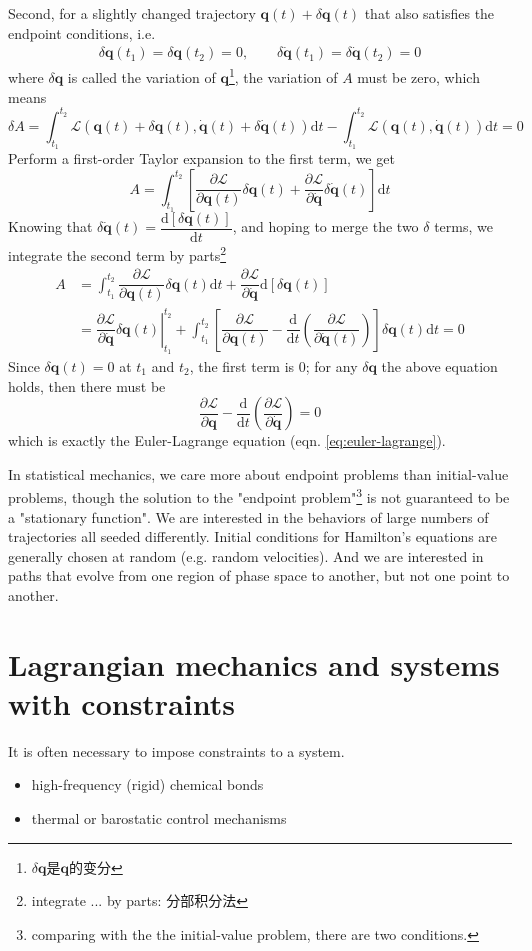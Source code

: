 \documentclass[
  10pt,
  twoside,
  openany,
  b5paper, %
  colorscheme = bootstrap-v4, %
]{qyxf-book}
\numberwithin{equation}{section}
\newcommand{\md}{\mathrm{d}}
\newcommand{\der}[2]{\dfrac{\md #1}{\md #2}}
\newcommand{\p}[2]{\dfrac{\partial #1}{\partial #2}}
\newcommand{\vq}{\boldsymbol{q}}
\newcommand{\dvq}{\dot{\vq}}
\newcommand{\dt}{\mathrm{d}t}
\newcommand{\lag}{\mathcal{L}} %
\newcommand{\intot}{\int_{t_1}^{t_2}}
\begin{document}
Second, for a slightly changed trajectory $\vq(t)+\delta \vq(t)$ that also satisfies the endpoint conditions, i.e.
\begin{gather}
	\delta\vq(t_1)=\delta\vq(t_2)=0,\qquad \delta\dvq(t_1)=\delta\dvq(t_2)=0
\end{gather}
where $\delta\vq$ is called the variation of $\vq$\footnote{$\delta\vq$是$\vq$的变分},
the variation of $A$ must be zero, which means
\begin{equation*}
	\delta A=\intot\lag\left(\vq(t)+\delta\vq(t),\dvq(t)+\delta\dvq(t)\right)\dt
	-\intot\lag\left(\vq(t),\dvq(t)\right)\dt=0
\end{equation*}
Perform a first-order Taylor expansion to the first term, we get
\begin{equation*}
	A=\intot\left[\p{\lag}{\vq(t)}\delta\vq(t)+\p{\lag}{\dvq}\delta\dvq(t)\right]\dt
\end{equation*}
Knowing that $\delta\dvq(t)=\der{\left[\delta\vq(t)\right]}{t}$, and hoping to merge the two $\delta$ terms, we integrate the second term by parts\footnote{integrate ... by parts: 分部积分法}
\begin{align*}
	A&=\intot\p{\lag}{\vq(t)}\delta\vq(t)\dt+\p{\lag}{\dvq}\md\left[\delta\vq(t)\right]\\
	&=\left.\p{\lag}{\dvq}\delta\vq(t)\right|_{t_1}^{t_2}+\intot\left[\p{\lag}{\vq(t)}-\der{}{t}\left(\p{\lag}{\dvq(t)}\right)\right]\delta\vq(t)\dt=0
\end{align*}
Since $\delta\vq(t)=0$ at $t_1$ and $t_2$, the first term is 0; for any $\delta\vq$ the above equation holds, then there must be
\begin{equation}
	\p{\lag}{\vq}-\der{}{t}\left(\p{\lag}{\dvq}\right)=0
\end{equation}
which is exactly the Euler-Lagrange equation (eqn. \ref{eq:euler-lagrange}).

In statistical mechanics, we care more about endpoint problems than initial-value problems, though the solution to the "endpoint problem"\footnote{comparing with the the initial-value problem, there are two conditions.} is not guaranteed to be a "stationary function". We are interested in the behaviors of large numbers of trajectories all seeded differently. Initial conditions for Hamilton's equations are generally chosen at random (e.g. random velocities). And we are interested in paths that evolve from one region of phase space to another, but not one point to another.

\section{Lagrangian mechanics and systems with constraints}
It is often necessary to impose constraints to a system.
\begin{itemize}
	\item high-frequency (rigid) chemical bonds
	\item thermal or barostatic control mechanisms
\end{itemize}
\end{document}
